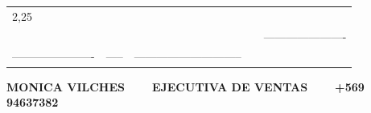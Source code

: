 \documentclass[10pt]{article}
\begin{document}
\begin{tabular}{lllll}
2,25 \\  
 & & & &\color{white}---------------------- \\
 \color{white}----------------------& \color{white}----- & \color{white}----------------------------- &\\

 \hline
 \end{tabular}
 \begin{center}
     \textbf{MONICA VILCHES  $\color{white}--$  EJECUTIVA DE VENTAS $\color{white}--$   +569 94637382}
 \end{center}
 
\end{document}
